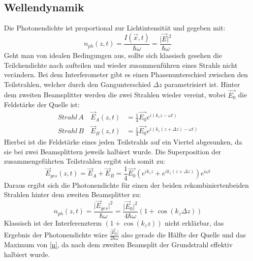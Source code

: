 \documentclass{include/thesisclass3}
\begin{document}
\subsection{Wellendynamik}
Die Photonendichte ist proportional zur Lichtintensität und gegeben mit:
\begin{equation}
n_{ph}(z,t)=\frac{I(\vec{x},t)}{\hbar \omega}=\frac{\vert \vec{E}\vert ^2}{\hbar \omega}
\end{equation}
Geht man von idealen Bedingungen aus, sollte sich klassisch gesehen die Teilchendichte nach aufteilen und wieder zusammenführen eines Strahls nicht verändern. Bei dem Interferometer gibt es einen Phasenunterschied zwischen den Teilstrahlen, welcher durch den Gangunterschied $\Delta z$ parametrisiert ist. Hinter dem zweiten Beamsplitter werden die zwei Strahlen wieder vereint, wobei $\vec{E_0}$ die Feldstärke der Quelle ist:
\begin{align}
\si{Strahl\, A}\quad \vec{E}_A(z,t)&=\frac{1}{4}\vec{E_0}e^{i(k_z z-\omega t)}\\
\si{Strahl\, B}\quad \vec{E}_B(z,t)&=\frac{1}{4}\vec{E_0}e^{i(k_z (z+\Delta z)-\omega t)}
\end{align}
Hierbei ist die Feldstärke eines jeden Teilstrahls auf ein Viertel abgesunken, da sie bei zwei Beamsplittern jeweils halbiert wurde. Die Superposition der zusammengeführten Teilstrahlen ergibt sich somit zu:
\begin{equation}
\vec{E}_{ges}(z,t)= \vec{E}_A+\vec{E}_B=\frac{1}{4}\vec{E_0}(e^{ik_z z}+e^{ik_z (z+\Delta z)})e^{i\omega t}
\end{equation}
Daraus ergibt sich die Photonendichte für einen der beiden rekombiniertenbeiden Strahlen hinter dem zweiten Beamsplitter zu:
\begin{equation}
n_{ph}(z,t)=\frac{\vert \vec{E}_{ges} \vert ^2}{\hbar \omega}=\frac{\vert \vec{E}_0\vert ^2}{4\hbar\omega}(1+\cos(k_z\Delta z))\label{n}
\end{equation}
Klassisch ist der Interferenzterm $(1+\cos(k_z z))$ nicht erklärbar, das Ergebnis der Photonendichte wäre $\frac{\vert \vec{E}_0\vert}{2\hbar \omega}$ also gerade die Hälfte der Quelle und das Maximum von \ref{n}, da nach dem zweiten Beamsplit der Grundstrahl effektiv halbiert wurde. 
\end{document}

